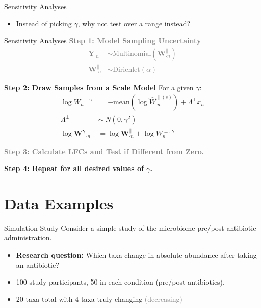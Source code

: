 \documentclass[
  ignorenonframetext,
]{beamer}
\providecommand{\tightlist}{%
  \setlength{\itemsep}{0pt}\setlength{\parskip}{0pt}}
\begin{document}
\begin{frame}{Sensitivity Analyses}
\protect\hypertarget{sensitivity-analyses}{}
\begin{itemize}
\tightlist
\item
  Instead of picking \(\gamma\), why not test over a range instead?
\end{itemize}
\end{frame}

\begin{frame}{Sensitivity Analyses}
\protect\hypertarget{sensitivity-analyses-1}{}
\textcolor{gray}{\textbf{Step 1: Model Sampling Uncertainty}}
\textcolor{gray}{\begin{align*}
\mathbf{Y}_{\cdot n} &\sim \text{Multinomial}(\mathbf{W}_{\cdot n}^\parallel)\\
\mathbf{W}_{\cdot n}^\parallel &\sim \text{Dirichlet}(\alpha)
\end{align*}}

\textbf{Step 2: Draw Samples from a Scale Model} For a given \(\gamma\):
\begin{align*}
\log W_{n}^{\perp, \gamma} &= - \mathrm{mean} \left(\log \hat{W}^{\parallel (s)}_{\cdot n}\right) + \Lambda^\perp x_{n}\\
\Lambda^\perp  &\sim \ N(0, \gamma^2)\\
\log \mathbf{W^\gamma}_{\cdot n} &= \log \mathbf{W}_{\cdot n}^\parallel + \log W_{n}^{\perp, \gamma}
\end{align*}

\textcolor{gray}{\textbf{Step 3: Calculate LFCs and Test if Different from Zero.}}

\textbf{Step 4: Repeat for all desired values of $\gamma$.}
\end{frame}

\hypertarget{data-examples}{%
\section{Data Examples}\label{data-examples}}

\begin{frame}{Simulation Study}
\protect\hypertarget{simulation-study}{}
Consider a simple study of the microbiome pre/post antibiotic
administration.

\begin{itemize}
\item
  \textbf{Research question:} Which taxa change in absolute abundance
  after taking an antibiotic?
\item
  100 study participants, 50 in each condition (pre/post antibiotics).
\item
  20 taxa total with 4 taxa truly changing
  \textcolor{gray}{(decreasing)}
\end{itemize}
\end{frame}
\end{document}
